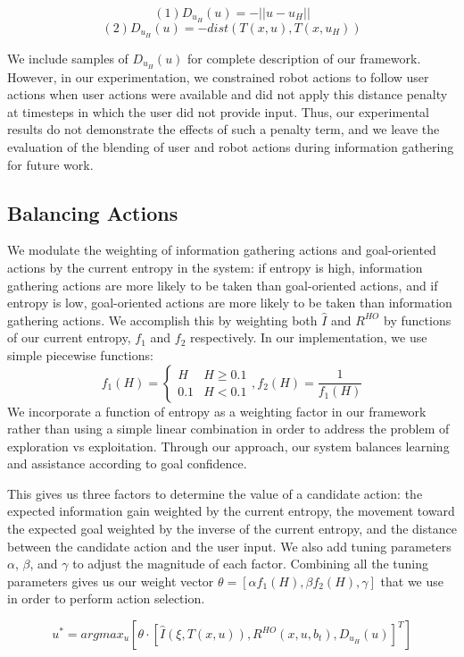 \documentclass[conference]{IEEEtran}
\begin{document}
\[
(1) D_{u_H}(u) = -||u - u_H||
\]
\[
(2) D_{u_H}(u) = -dist(T(x,u), T(x, u_H))
\]

We include samples of $D_{u_H}(u)$ for complete description of our framework. However, in our experimentation, we constrained robot actions to follow user actions when user actions were available and did not apply this distance penalty at timesteps in which the user did not provide input. Thus, our experimental results do not demonstrate the effects of such a penalty term, and we leave the evaluation of the blending of user and robot actions during information gathering for future work.

\subsection{Balancing Actions}

We modulate the weighting of information gathering actions and goal-oriented actions by the current entropy in the system: if entropy is high, information gathering actions are more likely to be taken than goal-oriented actions, and if entropy is low, goal-oriented actions are more likely to be taken than information gathering actions. We accomplish this by weighting both $\hat{I}$ and $R^{HO}$ by functions of our current entropy, $f_1$ and $f_2$ respectively. In our implementation, we use simple piecewise functions:
\[
f_1(H) =
\begin{cases}
H & H\geq 0.1 \\
0.1 & H < 0.1
\end{cases}
,f_2(H) = \frac{1}{f_1(H)}
\]
We incorporate a function of entropy as a weighting factor in our framework rather than using a simple linear combination in order to address the problem of exploration vs exploitation. Through our approach, our system balances learning and assistance according to goal confidence.

This gives us three factors to determine the value of a candidate action: the expected information gain weighted by the current entropy, the movement toward the expected goal weighted by the inverse of the current entropy, and the distance between the candidate action and the user input. We also add tuning parameters $\alpha$, $\beta$, and $\gamma$ to adjust the magnitude of each factor. Combining all the tuning parameters gives us our weight vector $\theta = [\alpha f_1(H), \beta f_2(H), \gamma]$ that we use in order to perform action selection.

\[
u^* = argmax_u [ \theta \cdot [\hat{I}(\xi, T(x,u)), R^{HO}(x,u,b_t), D_{u_H}(u)]^T ]
\]
\end{document}
